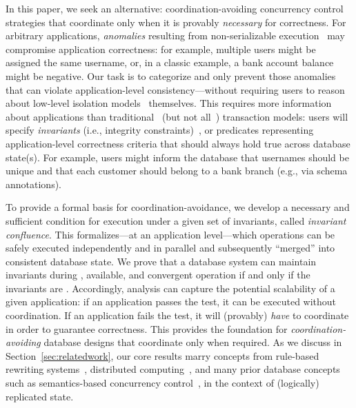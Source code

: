In this paper, we seek an alternative: coordination-avoiding
concurrency control strategies that coordinate only when it is
provably \textit{necessary} for correctness. For arbitrary
applications, \textit{anomalies} resulting from non-serializable
execution~\cite{adya-isolation} may compromise application
correctness: for example, multiple users might be assigned the same
username, or, in a classic example, a bank account balance might be
negative. Our task is to categorize and only prevent those anomalies
that can violate application-level consistency---without requiring
users to reason about low-level isolation models~\cite{hat-vldb}
themselves. This requires more information about applications than
traditional~\cite{bernstein-book,gray-virtues} (but not
all~\cite{eswaran-consistency,korth-serializability,decomp-semantics,garciamolina-semantics,activedb-book,ic-survey,ic-survey-two})
transaction models: users will specify \textit{invariants} (i.e.,
integrity constraints)~\cite{traiger-tods}, or predicates representing
application-level correctness criteria that should always hold true
across database state(s). For example, users might inform the database
that usernames should be unique and that each customer should belong
to a bank branch (e.g., via schema annotations).

To provide a formal basis for coordination-avoidance, we develop a
necessary and sufficient condition for \cfree execution under a given
set of invariants, called \textit{invariant confluence}. This
\iconfluence formalizes---at an application level---which operations
can be safely executed independently and in parallel and subsequently
``merged'' into consistent database state. We prove that a database
system can maintain invariants during \cfree, available, and
convergent operation if and only if the invariants are
\iconfluent. Accordingly, \iconfluence analysis can capture the
potential scalability of a given application: if an application passes
the \iconfluence test, it can be executed without coordination. If an
application fails the test, it will (provably) \textit{have} to
coordinate in order to guarantee correctness. This provides the
foundation for \textit{coordination-avoiding} database designs that
coordinate only when required. As we discuss in
Section~\ref{sec:relatedwork}, our core results marry concepts from
rule-based rewriting systems~\cite{obs-confluence,termrewriting},
distributed computing~\cite{herlihy-apologizing,gilbert-cap,hat-vldb},
and many prior database
concepts~\cite{activedb-book,ic-survey,ic-survey-two} such as
semantics-based concurrency
control~\cite{sdd1,decomp-semantics,badrinath-semantics,garciamolina-semantics,korth-serializability,atomictransactions,weihl-thesis},
in the context of (logically) replicated state.

